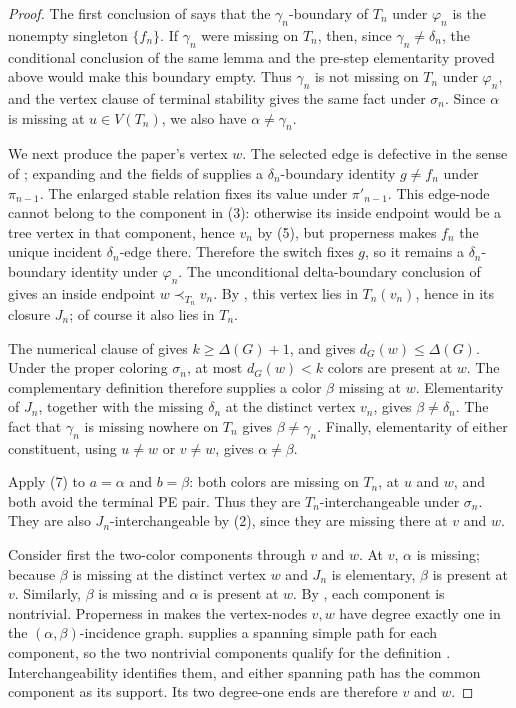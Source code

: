\begin{proof}
The first conclusion of  says that
the $\gamma_n$-boundary of $T_n$ under $\varphi_n$ is the nonempty
singleton $\{f_n\}$.  If $\gamma_n$ were missing on $T_n$, then, since
$\gamma_n\ne\delta_n$, the conditional conclusion of the same lemma and
the pre-step elementarity proved above would make this boundary empty.
Thus $\gamma_n$ is not missing on $T_n$ under $\varphi_n$, and the vertex
clause of terminal stability gives the same fact under $\sigma_n$.
Since $\alpha$ is missing at $u\in V(T_n)$, we also have
$\alpha\ne\gamma_n$.

We next produce the paper's vertex $w$.  The selected edge is defective
in the sense of ; expanding
 and the fields of
 supplies a
$\delta_n$-boundary identity $g\ne f_n$ under $\pi_{n-1}$.  The enlarged
stable relation fixes its value under $\pi'_{n-1}$.  This edge-node cannot
belong to the component in (3): otherwise its inside endpoint would be a
tree vertex in that component, hence $v_n$ by (5), but properness makes
$f_n$ the unique incident $\delta_n$-edge there.  Therefore the switch
fixes $g$, so it remains a $\delta_n$-boundary identity under
$\varphi_n$.  The unconditional delta-boundary conclusion of
 gives an inside endpoint
$w\prec_{T_n}v_n$.  By , this vertex lies in
$T_n(v_n)$, hence in its closure $J_n$; of course it also lies in $T_n$.

The numerical clause of  gives
$k\geq\Delta(G)+1$, and  gives
$d_G(w)\leq\Delta(G)$.  Under the proper coloring $\sigma_n$, at most
$d_G(w)<k$ colors are present at $w$.  The complementary definition
 therefore supplies a color $\beta$ missing at
$w$.  Elementarity of $J_n$, together with the missing
$\delta_n$ at the distinct vertex $v_n$, gives
$\beta\ne\delta_n$.  The fact that $\gamma_n$ is missing nowhere on
$T_n$ gives $\beta\ne\gamma_n$.  Finally, elementarity of either
constituent, using $u\ne w$ or $v\ne w$, gives $\alpha\ne\beta$.

Apply (7) to $a=\alpha$ and $b=\beta$: both colors are missing on
$T_n$, at $u$ and $w$, and both avoid the terminal PE pair.  Thus they
are $T_n$-interchangeable under $\sigma_n$.  They are also
$J_n$-interchangeable by (2), since they are missing there at $v$ and
$w$.

Consider first the two-color components through $v$ and $w$.  At $v$,
$\alpha$ is missing; because $\beta$ is missing at the distinct vertex
$w$ and $J_n$ is elementary, $\beta$ is present at $v$.  Similarly,
$\beta$ is missing and $\alpha$ is present at $w$.  By
, each component is nontrivial.  Properness in
 makes the vertex-nodes $v,w$ have degree
exactly one in the $(\alpha,\beta)$-incidence graph.
 supplies a spanning simple path
for each component, so the two nontrivial components qualify for the
definition .  Interchangeability identifies
them, and either spanning path has the common component as its support.
Its two degree-one ends are therefore $v$ and $w$.


\end{proof}
